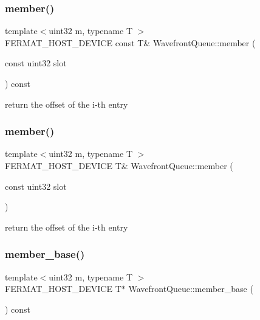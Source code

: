\subsubsection{\texorpdfstring{member()}{member()}\hspace{0.1cm}{\footnotesize\ttfamily [1/2]}}
{\footnotesize\ttfamily template$<$uint32 m, typename T $>$ \\
F\+E\+R\+M\+A\+T\+\_\+\+H\+O\+S\+T\+\_\+\+D\+E\+V\+I\+CE const T\& Wavefront\+Queue\+::member (\begin{DoxyParamCaption}\item[{const uint32}]{slot }\end{DoxyParamCaption}) const\hspace{0.3cm}{\ttfamily [inline]}}

return the offset of the i-\/th entry \mbox{\label{struct_wavefront_queue_a26d5b5f09cbb494c6df903b0811b77de}} 
\subsubsection{\texorpdfstring{member()}{member()}\hspace{0.1cm}{\footnotesize\ttfamily [2/2]}}
{\footnotesize\ttfamily template$<$uint32 m, typename T $>$ \\
F\+E\+R\+M\+A\+T\+\_\+\+H\+O\+S\+T\+\_\+\+D\+E\+V\+I\+CE T\& Wavefront\+Queue\+::member (\begin{DoxyParamCaption}\item[{const uint32}]{slot }\end{DoxyParamCaption})\hspace{0.3cm}{\ttfamily [inline]}}

return the offset of the i-\/th entry \mbox{\label{struct_wavefront_queue_a9eff696988c46605850fbe533f41ef77}} 
\subsubsection{\texorpdfstring{member\+\_\+base()}{member\_base()}}
{\footnotesize\ttfamily template$<$uint32 m, typename T $>$ \\
F\+E\+R\+M\+A\+T\+\_\+\+H\+O\+S\+T\+\_\+\+D\+E\+V\+I\+CE T$\ast$ Wavefront\+Queue\+::member\+\_\+base (\begin{DoxyParamCaption}{ }\end{DoxyParamCaption}) const\hspace{0.3cm}{\ttfamily [inline]}}

